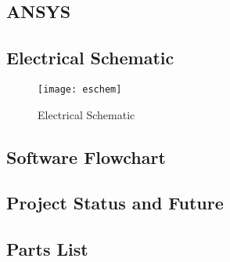 
\newpage
\subsection{ANSYS}
\newpage
\subsection{Electrical Schematic}

\begin{figure}[htp]
  \centering
  \texttt{[image: eschem]}
  \caption{Electrical Schematic}
\end{figure}


\newpage
\subsection{Software Flowchart}


% 

\subsection{Project Status and Future}
\newpage
\subsection{Parts List}

